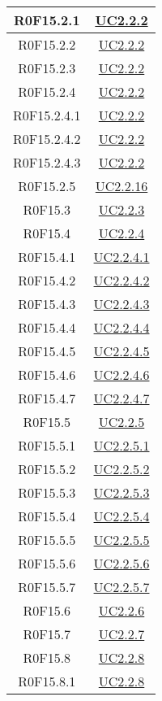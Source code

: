 \documentclass[../AnalisiDeiRequisiti.tex]{subfiles}
\begin{document}
\begin{longtable}{|c|c|}
	R0F15.2.1 & \hyperlink{UC2.2.2}{UC2.2.2}\\\hline
	R0F15.2.2 & \hyperlink{UC2.2.2}{UC2.2.2}\\\hline
	R0F15.2.3 & \hyperlink{UC2.2.2}{UC2.2.2}\\\hline
	R0F15.2.4 & \hyperlink{UC2.2.2}{UC2.2.2}\\\hline
	R0F15.2.4.1 & \hyperlink{UC2.2.2}{UC2.2.2}\\\hline
	R0F15.2.4.2 & \hyperlink{UC2.2.2}{UC2.2.2}\\\hline
	R0F15.2.4.3 & \hyperlink{UC2.2.2}{UC2.2.2}\\\hline
	R0F15.2.5 & \hyperlink{UC2.2.16}{UC2.2.16}\\\hline
	R0F15.3 & \hyperlink{UC2.2.3}{UC2.2.3}\\\hline
	R0F15.4 & \hyperlink{UC2.2.4}{UC2.2.4}\\\hline
	R0F15.4.1 & \hyperlink{UC2.2.4.1}{UC2.2.4.1}\\\hline
	R0F15.4.2 & \hyperlink{UC2.2.4.2}{UC2.2.4.2}\\\hline
	R0F15.4.3 & \hyperlink{UC2.2.4.3}{UC2.2.4.3}\\\hline
	R0F15.4.4 & \hyperlink{UC2.2.4.4}{UC2.2.4.4}\\\hline
	R0F15.4.5 & \hyperlink{UC2.2.4.5}{UC2.2.4.5}\\\hline
	R0F15.4.6 & \hyperlink{UC2.2.4.6}{UC2.2.4.6}\\\hline
	R0F15.4.7 & \hyperlink{UC2.2.4.7}{UC2.2.4.7}\\\hline
	R0F15.5 & \hyperlink{UC2.2.5}{UC2.2.5}\\\hline
	R0F15.5.1 & \hyperlink{UC2.2.5.1}{UC2.2.5.1}\\\hline
	R0F15.5.2 & \hyperlink{UC2.2.5.2}{UC2.2.5.2}\\\hline
	R0F15.5.3 & \hyperlink{UC2.2.5.3}{UC2.2.5.3}\\\hline
	R0F15.5.4 & \hyperlink{UC2.2.5.4}{UC2.2.5.4}\\\hline
	R0F15.5.5 & \hyperlink{UC2.2.5.5}{UC2.2.5.5}\\\hline
	R0F15.5.6 & \hyperlink{UC2.2.5.6}{UC2.2.5.6}\\\hline
	R0F15.5.7 & \hyperlink{UC2.2.5.7}{UC2.2.5.7}\\\hline
	R0F15.6 & \hyperlink{UC2.2.6}{UC2.2.6}\\\hline
	R0F15.7 & \hyperlink{UC2.2.7}{UC2.2.7}\\\hline
	R0F15.8 & \hyperlink{UC2.2.8}{UC2.2.8}\\\hline
	R0F15.8.1 & \hyperlink{UC2.2.8}{UC2.2.8}\\\hline

\end{longtable}
\end{document}
